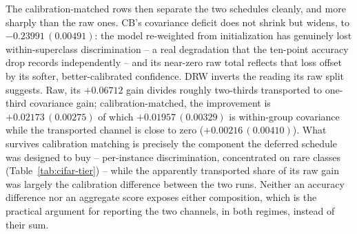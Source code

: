 The calibration-matched rows then separate the two schedules cleanly, and more sharply
than the raw ones. CB's covariance deficit does not shrink but widens, to
$-0.23991\,(0.00491)$: the model re-weighted from initialization has genuinely lost
within-superclass discrimination -- a real degradation that the ten-point accuracy drop
records independently -- and its near-zero raw total reflects that loss offset by its
softer, better-calibrated confidence. DRW inverts the reading its raw split suggests.
Raw, its $+0.06712$ gain divides roughly two-thirds transported to one-third covariance gain;
calibration-matched, the improvement is $+0.02173\,(0.00275)$ of which
$+0.01957\,(0.00329)$ is within-group covariance while the transported channel is close to zero
($+0.00216\,(0.00410)$). What survives calibration matching is precisely the component
the deferred schedule was designed to buy -- per-instance discrimination, concentrated
on rare classes (Table~\ref{tab:cifar-tier}) -- while the apparently transported
share of its raw gain was largely the calibration difference between the two runs.
Neither an accuracy difference nor an aggregate score exposes either composition, which
is the practical argument for reporting the two channels, in both regimes, instead of
their sum.

\begin{table}[t]
\centering
\caption{Raw and calibration-matched decompositions on CIFAR-100-LT at the superclass
audit. Temperatures are fitted by likelihood on a held-out calibration half of the test
split; every decomposition uses the disjoint audit half; entries are means (sd) over
twenty random splits. The final row is the control: recalibrating the baseline alone
carries no instance information yet moves both channels substantially.}
\label{tab:cifar-cal}
\end{table}

